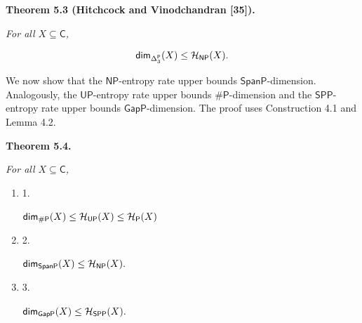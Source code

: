 \par\medskip\noindent\textbf{
\textbf{Theorem 5.3}\textbf{ }(Hitchcock and Vinodchandran [35])\textbf{.}
}\par



\emph{For all $X\subseteq\mathsf{C}$,}\par


\[\begin{gathered}
{\mathsf{dim}}_{\Delta^{\mathsf{P}}_{3}}(X)\leq{\cal H}_{\mathsf{NP}}(X).
\end{gathered}\]






We now show that the $\mathsf{NP}$-entropy rate upper bounds $\mathsf{SpanP}$-dimension. Analogously, the $\mathsf{UP}$-entropy rate upper bounds ${\mathsf{\#}\mathsf{P}}$-dimension and the $\mathsf{SPP}$-entropy rate upper bounds $\mathsf{GapP}$-dimension. The proof uses Construction 4.1 and Lemma 4.2.\par





\par\medskip\noindent\textbf{
\textbf{Theorem 5.4}\textbf{.}
}\par



\emph{For all $X\subseteq\mathsf{C}$,}\par


\begin{enumerate}


\item[] 
1. 


${\mathsf{dim}}_{\mathsf{\#}\mathsf{P}}(X)\leq{\cal H}_{\mathsf{UP}}(X)\leq{\cal H}_{\mathsf{P}}(X)$\emph{}\par





\item[] 
2. 


${\mathsf{dim}}_{\mathsf{SpanP}}(X)\leq{\cal H}_{\mathsf{NP}}(X).$\emph{}\par





\item[] 
3. 


${\mathsf{dim}}_{\mathsf{GapP}}(X)\leq{\cal H}_{\mathsf{SPP}}(X).$\emph{}\par





\end{enumerate}



